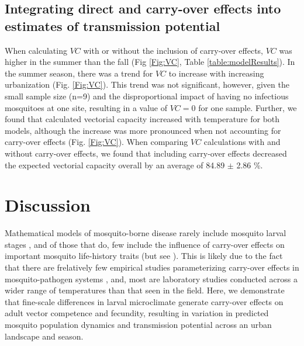 \documentclass[12pt]{article}
\begin{document}
\subsection{Integrating direct and carry-over effects into estimates of transmission potential}

When calculating $VC$ with or without the inclusion of carry-over effects, $VC$ was higher in the summer than the fall (Fig \ref{Fig:VC}, Table \ref{table:modelResults}). In the summer season, there was a trend for $VC$ to increase with increasing urbanization (Fig. \ref{Fig:VC}). This trend was not significant, however, given the small sample size (n=9) and the disproportional impact of having no infectious mosquitoes at one site, resulting in a value of $VC=0$ for one sample. Further, we found that calculated vectorial capacity increased with temperature for both models, although the increase was more pronounced when not accounting for carry-over effects (Fig. \ref{Fig:VC}). When comparing $VC$ calculations with and without carry-over effects, we found that including carry-over effects decreased the expected vectorial capacity overall by an average of 84.89 $\pm$ 2.86 \%.

\section{Discussion}

Mathematical models of mosquito-borne disease rarely include mosquito larval stages \citep{reiner2013}, and of those that do, few include the influence of carry-over effects on important mosquito life-history traits (but see \citep{roux2015a}). This is likely due to the fact that there are frelatively few empirical studies parameterizing  carry-over effects in mosquito-pathogen systems \citep{parham2015}, and, most  are laboratory studies conducted across a wider range of temperatures than that seen in the field. Here, we demonstrate that fine-scale differences in larval microclimate generate carry-over effects on adult vector competence and fecundity, resulting in variation in predicted mosquito population dynamics and transmission potential across an urban landscape and season.
\end{document}
